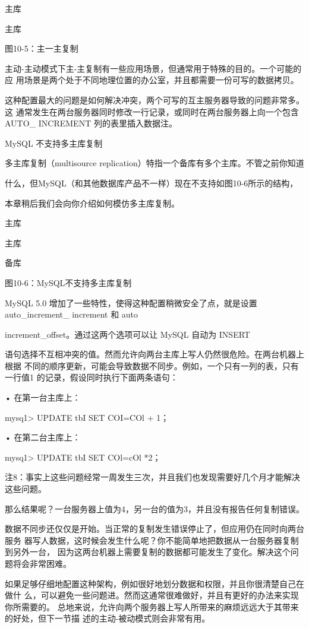 主库

主库

图10-5：主一主复制

主动-主动模式下主-主复制有一些应用场景，但通常用于特殊的目的。一个可能的应
用场景是两个处于不同地理位置的办公室，并且都需要一份可写的数据拷贝。

这种配置最大的问题是如何解决冲突，两个可写的互主服务器导致的问题非常多。这
通常发生在两台服务器同时修改一行记录，或同时在两台服务器上向一个包含AUTO\_
INCREMENT 列的表里插入数据注。

MySQL 不支持多主库复制

多主库复制（multisource replication）特指一个备库有多个主库。不管之前你知道

什么，但MySQL（和其他数据库产品不一样）现在不支持如图10-6所示的结构，

本章稍后我们会向你介绍如何模仿多主库复制。

主库

主库

备库

图10-6：MySQL不支持多主库复制

MySQL 5.0 增加了一些特性，使得这种配置稍微安全了点，就是设置 auto\_increment\_
increment 和 auto

increment\_offset。通过这两个选项可以让 MySQL 自动为 INSERT

语句选择不互相冲突的值。然而允许向两台主库上写人仍然很危险。在两台机器上根据
不同的顺序更新，可能会导致数据不同步。例如，一个只有一列的表，只有一行值1
的记录，假设同时执行下面两条语句：

• 在第一台主库上：

mysq1> UPDATE tbI SET COI=COl + 1；

• 在第二台主库上：

mysq1> UPDATE tbI SET COl=cOl *2；

注8：事实上这些问题经常一周发生三次，并且我们也发现需要好几个月才能解决这些问题。

那么结果呢？一台服务器上值为4，另一台的值为3，并且没有报告任何复制错误。

数据不同步还仅仅是开始。当正常的复制发生错误停止了，但应用仍在同时向两台服务
器写人数据，这时候会发生什么呢？你不能简单地把数据从一台服务器复制到另外一台，
因为这两台机器上需要复制的数据都可能发生了变化。解决这个问题将会非常困难。

如果足够仔细地配置这种架构，例如很好地划分数据和权限，并且你很清楚自己在做什
么，可以避免一些问题进。然而这通常很难做好，并且有更好的办法来实现你所需要的。
总地来说，允许向两个服务器上写人所带来的麻烦远远大于其带来的好处，但下一节描
述的主动-被动模式则会非常有用。

